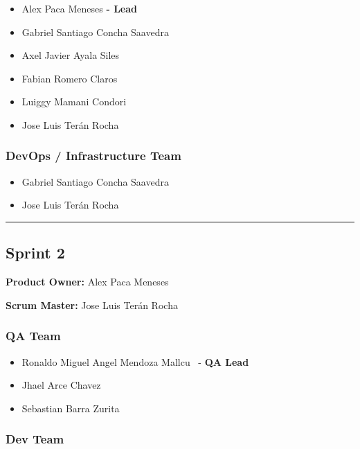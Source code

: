 \documentclass{article}
\providecommand{\tightlist}{
  \setlength{\itemsep}{0pt}\setlength{\parskip}{0pt}}
\begin{document}
\begin{itemize}
\tightlist
\item
  Alex Paca Meneses \textbf{- Lead}
\item
  Gabriel Santiago Concha Saavedra
\item
  Axel Javier Ayala Siles
\item
  Fabian Romero Claros
\item
  Luiggy Mamani Condori
\item
  Jose Luis Terán Rocha
\end{itemize}

\subsubsection{DevOps / Infrastructure Team}\label{devops-team-1}

\begin{itemize}
\tightlist
\item
  Gabriel Santiago Concha Saavedra
\item
  Jose Luis Terán Rocha
\end{itemize}

\begin{center}\rule{0.5\linewidth}{0.5pt}\end{center}

\hypertarget{sprint2}{
\subsection{\texorpdfstring{\textbf{Sprint
2}}{Sprint 2}}\label{sprint2}}

\textbf{Product Owner: }
Alex Paca Meneses

\textbf{Scrum Master: }
Jose Luis Terán Rocha

\hypertarget{qateam-2}{
\subsubsection{\texorpdfstring{\textbf{QA Team}}{QA Team}}\label{qateam-2}}

\begin{itemize}
\tightlist
\item
  Ronaldo Miguel Angel Mendoza Mallcu ~- \textbf{QA Lead}
\item
  Jhael Arce Chavez
\item
  Sebastian Barra Zurita
\end{itemize}

\hypertarget{devteam-2}{
\subsubsection{\texorpdfstring{\textbf{Dev
Team}}{Dev Team}}\label{devteam-2}}
\end{document}
